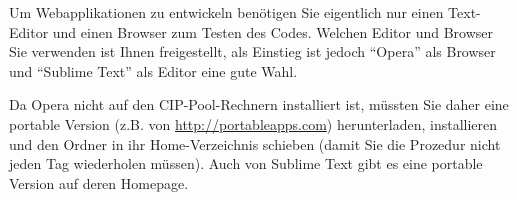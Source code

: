 %
\par Um Webapplikationen zu entwickeln benötigen Sie eigentlich nur einen Text-Editor und einen Browser zum Testen des Codes. Welchen Editor und Browser Sie verwenden ist Ihnen freigestellt, als Einstieg ist jedoch ``Opera'' als Browser und ``Sublime Text'' als Editor eine gute Wahl. 
%
\par Da Opera nicht auf den CIP-Pool-Rechnern installiert ist, müssten Sie daher eine portable Version (z.B. von \url{http://portableapps.com}) herunterladen, installieren und den Ordner in ihr Home-Verzeichnis schieben (damit Sie die Prozedur nicht jeden Tag wiederholen müssen). Auch von Sublime Text gibt es eine portable Version auf deren Homepage.